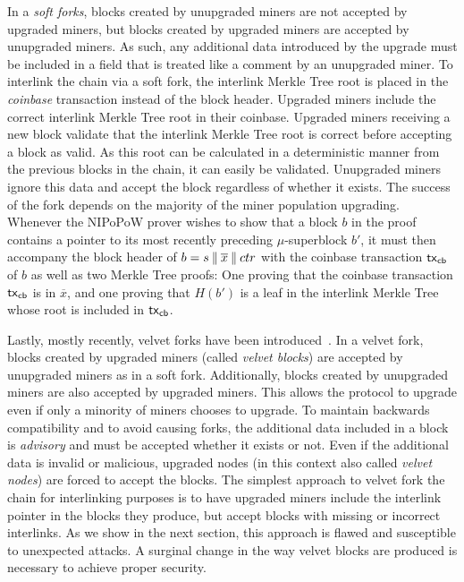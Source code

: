 In a \emph{soft forks}, blocks created by unupgraded miners are not accepted by
upgraded miners, but blocks created by upgraded miners are accepted by
unupgraded miners. As such, any additional data introduced by the upgrade must
be included in a field that is treated like a comment by an unupgraded miner.
To interlink the chain via a soft fork, the interlink Merkle Tree root is
placed in the \emph{coinbase} transaction instead of the block header. Upgraded
miners include the correct interlink Merkle Tree root in their coinbase.
Upgraded miners receiving a new block validate that the interlink Merkle Tree
root is correct before accepting a block as valid. As this root can be
calculated in a deterministic manner from the previous blocks in the chain, it
can easily be validated. Unupgraded miners ignore this data and accept the block
regardless of whether it exists. The success of the fork depends on the majority
of the miner population upgrading. Whenever the NIPoPoW prover wishes to show that a
block $b$ in the proof contains a pointer to its most recently preceding
$\mu$-superblock $b'$, it must then accompany the block header of $b = s \mathbin{\|}
\overline{x} \mathbin{\|} ctr$ with the coinbase transaction $\mathsf{tx}_{\mathsf{cb}}$ of $b$ as well
as two Merkle Tree proofs: One proving that the coinbase transaction $\mathsf{tx}_{\mathsf{cb}}$
is in $\overline{x}$, and one proving that $H(b')$ is a leaf in the interlink
Merkle Tree whose root is included in $\mathsf{tx}_{\mathsf{cb}}$.

Lastly, mostly recently, velvet forks have been introduced~\cite{velvet}. In a
velvet fork, blocks created by upgraded miners (called \emph{velvet blocks}) are
accepted by unupgraded miners as in a soft fork. Additionally, blocks created by
unupgraded miners are also accepted by upgraded miners. This allows the protocol
to upgrade even if only a minority of miners chooses to upgrade. To maintain
backwards compatibility and to avoid causing forks, the additional data included
in a block is \emph{advisory} and must be accepted whether it exists or not.
Even if the additional data is invalid or malicious, upgraded nodes (in this
context also called \emph{velvet nodes}) are forced to accept the blocks. The
simplest approach to velvet fork the chain for interlinking purposes is to have
upgraded miners include the interlink pointer in the blocks they produce, but
accept blocks with missing or incorrect interlinks. As we show in the next
section, this approach is flawed and susceptible to unexpected attacks. A
surginal change in the way velvet blocks are produced is necessary to achieve
proper security.
